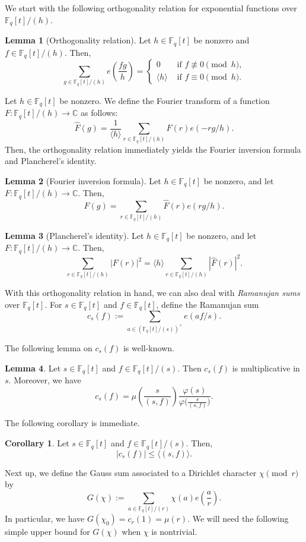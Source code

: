 \documentclass{article}
\theoremstyle{definition}
\newtheorem{cor}{Corollary}[section]
\newtheorem{lem}{Lemma}[section]
\theoremstyle{definition}
\theoremstyle{remark}
\newcommand{\C}{\mathbb{C}}
\newcommand{\F}{\mathbb{F}_q[t]}
\renewcommand\phi\varphi
\newcommand{\1}{\mathbf{1}}
\numberwithin{equation}{section}
\begin{document}
We start with the following orthogonality relation for exponential functions over $\F\slash (h)$. 
\begin{lem}[Orthogonality relation]\label{orthogonalityrelation}
Let $h\in \F$ be nonzero and $f\in \F/(h)$. Then,
\[
\sum_{g\in \F/(h)}e\left(\frac{fg}{h}\right)
=
\begin{cases}
0&\text{ if } f\not\equiv 0\pmod{h},\\
\langle h \rangle&\text{ if }f\equiv 0\pmod{h}.
\end{cases}
\]
\end{lem}

Let $h\in \F$ be nonzero. We define the Fourier transform of a function $F: \F\slash (h)\to \C$ as follows: 
\[\widehat{F}(g)=\frac{1}{\langle h \rangle }\sum_{r\in \F\slash (h)}F(r)e(-rg \slash h).\]
Then, the orthogonality relation immediately yields the Fourier inversion formula and Plancherel's identity. 

\begin{lem}[Fourier inversion formula]
Let $h\in \F$ be nonzero, and let $F: \F\slash (h)\to \C$. Then, 
\[F(g)=\sum_{r\in \F\slash (h)}\widehat{F}(r)e(rg\slash h).\]
\end{lem}
\begin{lem}[Plancherel's identity]
Let $h\in \F$ be nonzero, and let $F: \F\slash (h)\to \C$. Then, 
\[\sum_{r\in \F\slash (h)}|F(r)|^2=\langle h \rangle \sum_{r\in \F\slash (h)}|\widehat{F}(r)|^2.\]
\end{lem}
With this orthogonality relation in hand, we can also deal with \textit{Ramanujan sums} over $\F$. For $s\in \F$ and $f\in\F$, define the Ramanujan sum
\[c_s(f):=\sum_{a\in (\F\slash (s))^\times}e(af\slash s).\] 
 
The following lemma on $c_s(f)$ is well-known.
\begin{lem}\label{RamanujanSumFormula}
Let $s\in \F$ and $f\in \F\slash (s)$. Then $ c_s(f)$ is multiplicative in $s$. Moreover, we have 
\[c_s(f)=\mu\left(\frac{s}{(s,f)}\right)\frac{\phi(s)}{\phi\big(\frac{s}{(s,f)}\big)}.\]
\end{lem}


The following corollary is immediate. 

\begin{cor}\label{ramanujansumbound}
Let $s\in \F$ and $f\in \F\slash (s)$. Then, 
\[|c_s(f)|\leq \langle (s,f)\rangle.\]
\end{cor}

Next up, we define the Gauss sum associated to a Dirichlet character $\chi\pmod{r}$ by
\[G(\chi):=\sum_{a\in \F\slash (r)}\chi(a)e\left(\frac{a}{r}\right).\]
In particular, we have $G(\chi_0)=c_r(1)=\mu(r)$. We will need the following simple upper bound for $G(\chi)$ when $\chi$ is nontrivial. 
\end{document}
